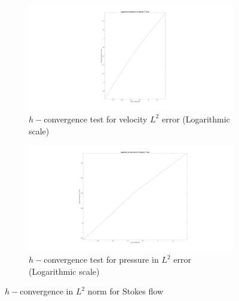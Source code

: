 \documentclass[a4paper,openany]{book}
\begin{document}
\begin{figure}
\begin{subfigure}{\textwidth}	
  \includegraphics[width=\linewidth]{l2_velocity_log_stokes.jpg}
  \caption{$h-$convergence test for velocity $L^2$ error (Logarithmic scale)}
  \label{fig:vel_stoke_conv_log}
\end{subfigure}
\begin{subfigure}{\textwidth}	
  \includegraphics[width=\linewidth]{l2_pressure_log_stokes.jpg}
  \caption{$h-$convergence test for pressure in $L^2$ error (Logarithmic scale)}
  \label{fig:pre_stoke_conv_log}
\end{subfigure}
\caption{$h-$convergence in $L^2$ norm for Stokes flow}
\label{fig:l2_stokes}
\end{figure}
\end{document}
